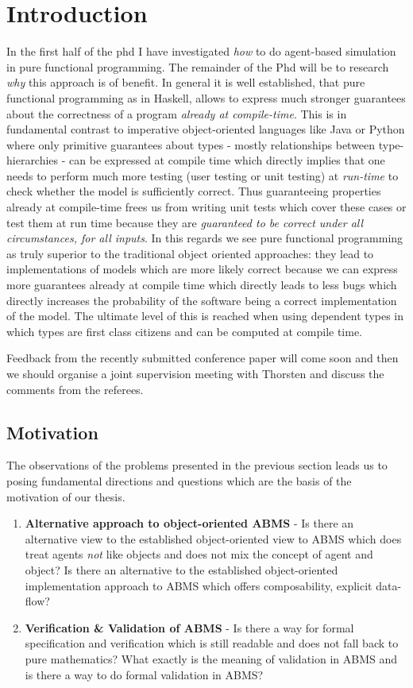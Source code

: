 \chapter{Introduction}
\label{chap:intro}

In the first half of the phd I have investigated \textit{how} to do agent-based simulation in pure functional programming. The remainder of the Phd will be to research \textit{why} this approach is of benefit. In general it is well established, that pure functional programming as in Haskell, allows to express much stronger guarantees about the correctness of a program \textit{already at compile-time}. This is in fundamental contrast to imperative object-oriented languages like Java or Python where only primitive guarantees about types - mostly relationships between type-hierarchies - can be expressed at compile time which directly implies that one needs to perform much more testing (user testing or unit testing) at \textit{run-time} to check whether the model is sufficiently correct. Thus guaranteeing properties already at compile-time frees us from writing unit tests which cover these cases or test them at run time because they are \textit{guaranteed to be correct under all circumstances, for all inputs}. In this regards we see pure functional programming as truly superior to the traditional object oriented approaches: they lead to implementations of models which are more likely correct because we can express more guarantees already at compile time which directly leads to less bugs which directly increases the probability of the software being a correct implementation of the model.
The ultimate level of this is reached when using dependent types in which types are first class citizens and can be computed at compile time. 

Feedback from the recently submitted conference paper will come soon and then we should organise a joint supervision meeting with Thorsten and discuss the comments from the referees.

\section{Motivation}
The observations of the problems presented in the previous section leads us to posing fundamental directions and questions which are the basis of the motivation of our thesis.

\begin{enumerate}
	\item \textbf{Alternative approach to object-oriented ABMS} - Is there an alternative view to the established object-oriented view to ABMS which does treat agents \textit{not} like objects and does not mix the concept of agent and object? Is there an alternative to the established object-oriented implementation approach to ABMS which offers composability, explicit data-flow?
	\item \textbf{Verification \& Validation of ABMS} - Is there a way for formal specification and verification which is still readable and does not fall back to pure mathematics? What exactly is the meaning of validation in ABMS and is there a way to do formal validation in ABMS? 
\end{enumerate}